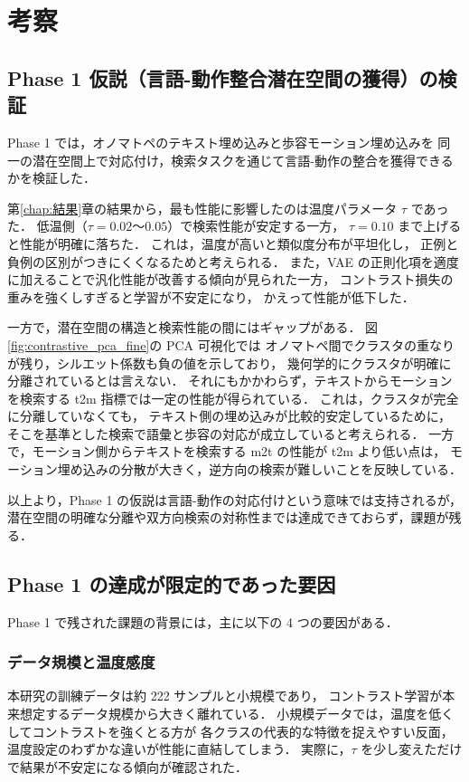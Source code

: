 \chapter{考察}
\label{chap:考察}

\section{Phase 1 仮説（言語-動作整合潜在空間の獲得）の検証}
\label{sec:contrastive_discussion}

Phase 1 では，オノマトペのテキスト埋め込みと歩容モーション埋め込みを
同一の潜在空間上で対応付け，検索タスクを通じて言語-動作の整合を獲得できるかを検証した．

第\ref{chap:結果}章の結果から，最も性能に影響したのは温度パラメータ $\tau$ であった．
低温側（$\tau=0.02$〜$0.05$）で検索性能が安定する一方，
$\tau=0.10$ まで上げると性能が明確に落ちた．
これは，温度が高いと類似度分布が平坦化し，
正例と負例の区別がつきにくくなるためと考えられる．
また，VAE の正則化項を適度に加えることで汎化性能が改善する傾向が見られた一方，
コントラスト損失の重みを強くしすぎると学習が不安定になり，
かえって性能が低下した．

一方で，潜在空間の構造と検索性能の間にはギャップがある．
図\ref{fig:contrastive_pca_fine}の PCA 可視化では
オノマトペ間でクラスタの重なりが残り，シルエット係数も負の値を示しており，
幾何学的にクラスタが明確に分離されているとは言えない．
それにもかかわらず，テキストからモーションを検索する t2m 指標では一定の性能が得られている．
これは，クラスタが完全に分離していなくても，
テキスト側の埋め込みが比較的安定しているために，
そこを基準とした検索で語彙と歩容の対応が成立していると考えられる．
一方で，モーション側からテキストを検索する m2t の性能が t2m より低い点は，
モーション埋め込みの分散が大きく，逆方向の検索が難しいことを反映している．

以上より，Phase 1 の仮説は言語-動作の対応付けという意味では支持されるが，
潜在空間の明確な分離や双方向検索の対称性までは達成できておらず，課題が残る．

\section{Phase 1 の達成が限定的であった要因}
\label{sec:phase1_factor_discussion}

Phase 1 で残された課題の背景には，主に以下の 4 つの要因がある．

\subsection{データ規模と温度感度}
本研究の訓練データは約 222 サンプルと小規模であり，
コントラスト学習が本来想定するデータ規模から大きく離れている．
小規模データでは，温度を低くしてコントラストを強くとる方が
各クラスの代表的な特徴を捉えやすい反面，
温度設定のわずかな違いが性能に直結してしまう．
実際に，$\tau$ を少し変えただけで結果が不安定になる傾向が確認された．

